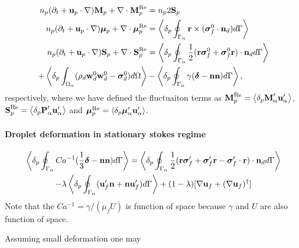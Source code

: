 \begin{align}
    n_p (\pddt + \textbf{u}_p \cdot \grad) \textbf{M}_p
    +\div  \textbf{M}_p^\text{Re}
    &=
    n_p2  \textbf{S}_p
    \label{eq:dt_hybrid_Mp}\\
    \label{eq:dt_hybrid_mup}
    n_p (\pddt + \textbf{u}_p \cdot \grad) \bm{\mu}_p
    + \div \bm{\mu}_p^\text{Re}
    &=
    \pSavg{\textbf{r}\times(\bm\sigma_f^0\cdot \textbf{n}_d)}
    \\
\label{eq:dt_hybrid_Sp}
n_p (\pddt + \textbf{u}_p \cdot \grad) \textbf{S}_p
+\div \textbf{S}_p^\text{Re}
&=
\pSavg{\frac{1}{2}(\textbf{r}\bm\sigma_f^0+\bm\sigma_f^0\textbf{r})\cdot \textbf{n}_d}\nonumber\\
+ \pOavg{
    (\rho_d \textbf{w}_d^0  \textbf{w}_d^0 
    - \bm{\sigma}_d^0)
}
&-  \pSavg{\gamma (\bm\delta - \textbf{nn})},
\end{align}
respectively, where we have defined the fluctuaiton terms as $
 \textbf{M}_p^\text{Re}
 = \left<\delta_p \textbf{M}_\alpha' \textbf{u}_\alpha'\right> $,  $ 
 \textbf{S}_p^\text{Re}
 = \left<\delta_p \textbf{P}_\alpha' \textbf{u}_\alpha'\right>$ and $ 
 \bm{\mu}_p^\text{Re}
 = \left<\delta_p \bm{\mu}_\alpha' \textbf{u}_\alpha'\right>
$.

\paragraph{Droplet deformation in stationary stokes regime}

\begin{multline}
    \left<\delta_p \oint_{\Gamma_{\alpha}} Ca^{-1} (\frac{1}{3}\bm\delta - \textbf{nn}) d\Gamma\right>
    =
    \left<\delta_p \oint_{\Gamma_{\alpha}} \frac{1}{2}(\textbf{r}\bm\sigma_f'+\bm\sigma_f'\textbf{r} - \bm\sigma_f'\cdot \textbf{r})\cdot \textbf{n}_d d\Gamma\right>\\
    - \lambda \left<\delta_p \oint_{\Gamma_{\alpha}} 
     (\textbf{u}_f' \textbf{n}
     + \textbf{n}\textbf{u}_f')
     d\Gamma\right>
    + (1 - \lambda)[\mathbf{\nabla} \textbf{u}_f + (\mathbf{\nabla} \textbf{u}_f)^\dagger]
\end{multline}
Note that the $Ca^{-1} = \gamma / (\mu_f U)$ is function of space because $\gamma$ and $U$ are also function of space. 

Assuming small deformation one may 
